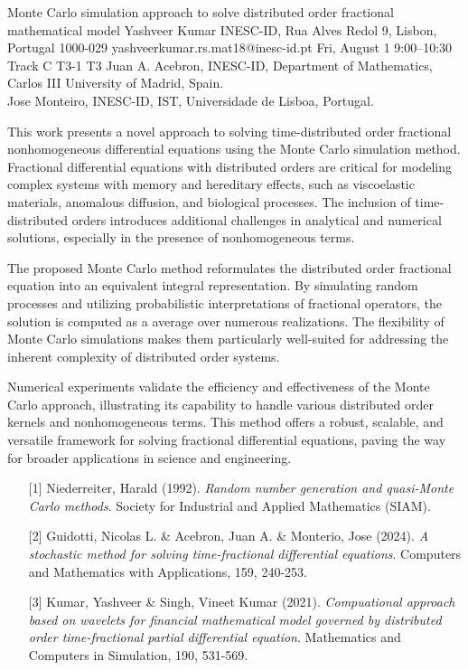 \begin{talk}
  {Monte Carlo simulation approach to solve distributed order fractional mathematical model}%
  {Yashveer Kumar}%
  {INESC-ID, Rua Alves Redol 9, Lisbon, Portugal 1000-029}%
  {yashveerkumar.rs.mat18@inesc-id.pt}%
  {}%
  {}%
  {Fri, August 1 9:00–10:30 Track C}%
  {T3-1}%
  {T3}%
  {Juan A. Acebron, INESC-ID,  Department of Mathematics, Carlos III University of Madrid, Spain.\\
  	Jose Monteiro, INESC-ID, IST, Universidade de Lisboa, Portugal.}%
			
			
This work presents a novel approach to solving time-distributed order fractional nonhomogeneous differential equations using the Monte Carlo simulation method. Fractional differential equations with distributed orders are critical for modeling complex systems with memory and hereditary effects, such as viscoelastic materials, anomalous diffusion, and biological processes. The inclusion of time-distributed orders introduces additional challenges in analytical and numerical solutions, especially in the presence of nonhomogeneous terms.

The proposed Monte Carlo method reformulates the distributed order fractional equation into an equivalent integral representation. By simulating random processes and utilizing probabilistic interpretations of fractional operators, the solution is computed as a average over numerous realizations. The flexibility of Monte Carlo simulations makes them particularly well-suited for addressing the inherent complexity of distributed order systems.

Numerical experiments validate the efficiency and effectiveness of the Monte Carlo approach, illustrating its capability to handle various distributed order kernels and nonhomogeneous terms. This method offers a robust, scalable, and versatile framework for solving fractional differential equations, paving the way for broader applications in science and engineering.

\medskip
\begin{enumerate}
	\item[{[1]}] Niederreiter, Harald (1992). {\it Random number generation and quasi-Monte Carlo methods}. Society for Industrial and Applied Mathematics (SIAM).
	\item[{[2]}] Guidotti, Nicolas L. \& Acebron, Juan A.  \&  Monterio, Jose (2024). {\it A stochastic method for solving time-fractional differential equations}. Computers and Mathematics with Applications, 159, 240-253.
	\item[{[3]}] Kumar, Yashveer \& Singh, Vineet Kumar (2021). {\it Compuational approach based on wavelets for financial mathematical model governed by distributed order time-fractional partial differential equation}. Mathematics and Computers in Simulation, 190, 531-569.
\end{enumerate}
\end{talk}
